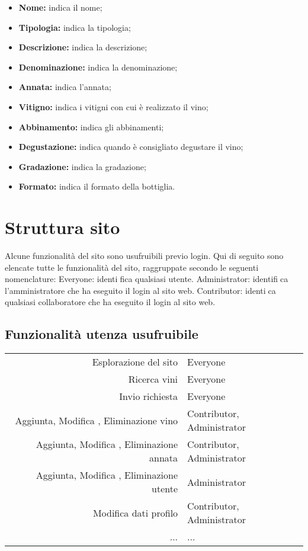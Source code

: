 \begin{itemize}
\begin{itemize}
		\item \textbf{Nome:} indica il nome;
		\item \textbf{Tipologia:} indica la tipologia;
		\item \textbf{Descrizione:} indica la descrizione;
		\item \textbf{Denominazione:} indica la denominazione;
		\item \textbf{Annata:} indica l'annata;
		\item \textbf{Vitigno:} indica i vitigni con cui è realizzato il vino;
		\item \textbf{Abbinamento:} indica gli abbinamenti;
		\item \textbf{Degustazione:} indica quando è consigliato degustare il vino;
		\item \textbf{Gradazione:} indica la gradazione;
		\item \textbf{Formato:} indica il formato della bottiglia.
	\end{itemize}
\end{itemize}

\section{Struttura sito}

Alcune funzionalità del sito sono usufruibili previo login. Qui di
seguito sono elencate tutte le funzionalità del sito, raggruppate secondo le seguenti
nomenclature:
Everyone: identifica qualsiasi utente.
Administrator: identifica l'amministratore che ha eseguito il login al sito web.
Contributor: identica qualsiasi collaboratore che ha eseguito il login al sito web.

\subsection{Funzionalità utenza usufruibile}

\begin{center}
	\begin{tabular}{r|l}
		Esplorazione del sito & Everyone \\
		Ricerca vini & Everyone \\
		Invio richiesta & Everyone \\
		Aggiunta, Modifica , Eliminazione vino & Contributor, Administrator \\
		Aggiunta, Modifica , Eliminazione annata & Contributor, Administrator \\
		Aggiunta, Modifica , Eliminazione utente & Administrator \\
		Modifica dati profilo & Contributor, Administrator \\
		... & ... \\
	\end{tabular}
\end{center}

